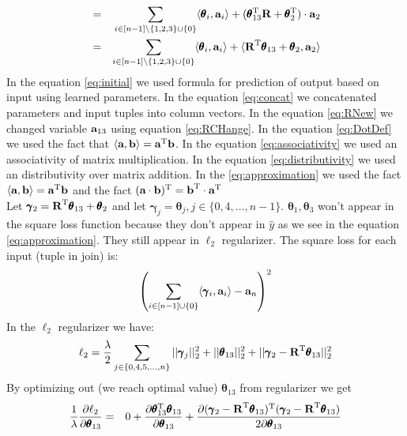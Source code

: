 \documentclass[10pt,a4paper]{article}
\begin{document}
\begin{enumerate}
\begin{eqnarray}
&=&
\sum_{ i\in [n-1] \setminus \{ 1, 2,3 \}\cup \{0\}} \langle \pmb{\theta}_i, \textbf{\text{{a}}}_i \rangle + (\pmb{\theta}_{13} ^ \text{T} \textbf{\text{{R}}}+ \pmb{\theta}_2  ^ \text{T})\cdot \textbf{\text{{a}}}_2  \label{eq:distributivity} \\
&=&
\sum_{ i\in [n-1]\setminus \{ 1, 2,3 \} \cup \{0\}} \langle \pmb{\theta}_i, \textbf{\text{{a}}}_i \rangle +   \langle \textbf{\text{{R}}} ^ \text{T} \pmb{\theta}_{13} +\pmb{\theta}_2 ,\textbf{\text{{a}}}_2 \rangle  \label{eq:approximation}
\end{eqnarray}
In the equation \ref{eq:initial} we used formula for prediction of output based on input using learned parameters. In the equation \ref{eq:concat} we concatenated parameters and input tuples into column vectors. In the equation \ref{eq:RNew} we changed variable $\textbf{\text{{a}}}_{13}$ using equation \ref{eq:RCHange}. 
In the equation \ref{eq:DotDef} we used the fact that $\langle \textbf{\text{{a}}}, \textbf{\text{{b}}} \rangle = \textbf{\text{{a}}} ^ \text{T} \textbf{\text{{b}}}$. In the equation \ref{eq:associativity} we used an associativity of matrix multiplication. In the equation \ref{eq:distributivity} we used an distributivity over matrix addition. In the \ref{eq:approximation} we used the fact  $\langle \textbf{\text{{a}}}, \textbf{\text{{b}}} \rangle = \textbf{\text{{a}}} ^ \text{T} \textbf{\text{{b}}}$ and the fact  $(\textbf{\text{{a}}} \cdot \textbf{\text{{b}}}) ^ \text{T} = \textbf{\text{{b}}} ^ \text{T} \cdot \textbf{\text{{a}}} ^ \text{T}$
\\
Let $\pmb{\gamma}_2 = \textbf{\text{{R}}} ^ \text{T}\pmb{\theta}_{13} + \pmb{\theta}_2$ and let $\pmb{\gamma}_j = \pmb{\theta}_j, j \in \{0, 4, ..., n-1\}$. $\pmb{\theta}_1, \pmb{\theta}_3$ won't appear in the square loss function because they don't appear in $\hat{y}$ as we see in the equation \ref{eq:approximation}. They still appear in $\ell_2$ regularizer. The square loss for each input (tuple in join) is:
$$
\left(\sum_{ i\in [n-1] \cup \{0\}} \langle \pmb{\gamma}_i, \textbf{\text{{a}}}_i \rangle - \textbf{\text{{a}}}_n\right)^2 \label{eq:approximation}
$$
In the $\ell_2$ regularizer we have:
$$\ell_2 = \frac{\lambda}{2} \sum_{j \in \{0, 4, 5, ..., n \} } ||\pmb{\gamma}_j||_2^2 + ||\pmb{\theta}_{13} ||^2_2 +  ||\pmb{\gamma}_2 - \textbf{\text{{R}}} ^ \text{T}\pmb{\theta}_{13}  ||_2^2$$
By optimizing out (we reach optimal value) $\pmb{\theta}_{13}$ from regularizer we get 
\begin{align}
\frac{1}{\lambda} \frac{\partial \ell_2}{\partial \pmb{\theta}_{13}} &=&
0 + 
\frac{\partial \transpose{\pmb{\theta}_{13}}\pmb{\theta}_{13}}{\partial \pmb{\theta}_{13}} + 
\frac{\partial \transpose{(\pmb{\gamma}_2 - 
\transpose{\mat{R}}\pmb{\theta}_{13})}(\pmb{\gamma}_2 - \transpose{\mat{R}}\pmb{\theta}_{13})}{2\partial \pmb{\theta}_{13}} \label{eq:simpleExp}\\

\end{align}
\end{enumerate}
\end{document}

